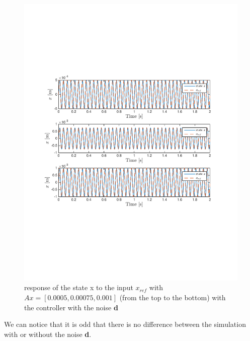 \begin{figure}[H]
 \centering 
 \includegraphics[trim=2cm 7cm 2cm 7cm, clip=true, totalheight=0.35\textheight, angle=0]{figures/p16d.pdf}
 \caption{response of the state x to the input $x_{ref}$ with $Ax = [0.0005,0.00075, 0.001]$ (from the top to the bottom) with the controller with the noise \textbf{d}}
 \label{fig:p16d}
\end{figure}

We can notice that it is odd that there is no difference between the simulation with or without the noise \textbf{d}.